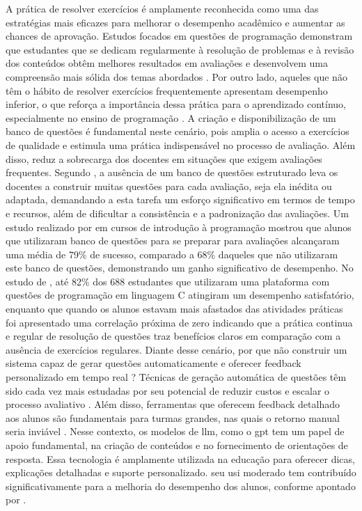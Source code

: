 A prática de resolver exercícios é amplamente reconhecida como uma das estratégias mais eficazes para melhorar o desempenho acadêmico e aumentar as chances de aprovação. Estudos focados em questões de programação demonstram que estudantes que se dedicam regularmente à resolução de problemas e à revisão dos conteúdos obtêm melhores resultados em avaliações e desenvolvem uma compreensão mais sólida dos temas abordados \parencite{Ahadi2016}. Por outro lado, aqueles que não têm o hábito de resolver exercícios frequentemente apresentam desempenho inferior, o que reforça a importância dessa prática para o aprendizado contínuo, especialmente no ensino de programação \parencite{Edwards2019}.  A criação e disponibilização de um banco de questões é fundamental neste cenário, pois amplia o acesso a exercícios de qualidade e estimula uma prática indispensável no processo de avaliação. Além disso, reduz a sobrecarga dos docentes em situações que exigem avaliações frequentes. Segundo \parencite{Puthiaparampil2020}, a ausência de um banco de questões estruturado leva os docentes a construir muitas questões  para cada avaliação, seja ela inédita ou adaptada,  demandando a esta tarefa um esforço significativo em termos de tempo e recursos, além de dificultar a consistência e a padronização das avaliações.  Um estudo realizado por \textcite{fossati2020} em cursos de introdução à programação mostrou que alunos que utilizaram banco de questões para se preparar para avaliações alcançaram uma média de 79\% de sucesso, comparado a 68\% daqueles que não utilizaram este banco de questões, demonstrando um ganho significativo de desempenho. No estudo de \textcite{Rodriguez2024}, até 82\% dos 688  estudantes que utilizaram uma plataforma com questões de programação em linguagem C atingiram um desempenho satisfatório, enquanto que quando os alunos estavam mais afastados das atividades práticas foi apresentado uma correlação próxima de zero indicando que a prática continua e regular de resolução de questões traz benefícios claros em comparação com a ausência de exercícios regulares.
Diante desse cenário, por que não construir um sistema capaz de gerar questões automaticamente e oferecer feedback personalizado em tempo real ? Técnicas de geração automática de questões têm sido cada vez mais estudadas por seu potencial de reduzir custos e escalar o processo avaliativo \parencite{kurdi2020, sewunetie2022}. Além disso, ferramentas que oferecem feedback detalhado aos alunos são fundamentais para turmas grandes, nas quais o retorno manual seria inviável \parencite{vanpraet2024, fung2024}. 
Nesse contexto, os modelos de \gls{llm}, como o \gls{gpt} tem um papel de apoio fundamental, na criação de conteúdos e no fornecimento de orientações de resposta. Essa tecnologia é amplamente utilizada na educação para oferecer dicas,  explicações detalhadas e suporte personalizado. seu usi moderado tem contribuído significativamente para a melhoria do desempenho dos alunos, conforme apontado por \parencite{yang2024}. 

